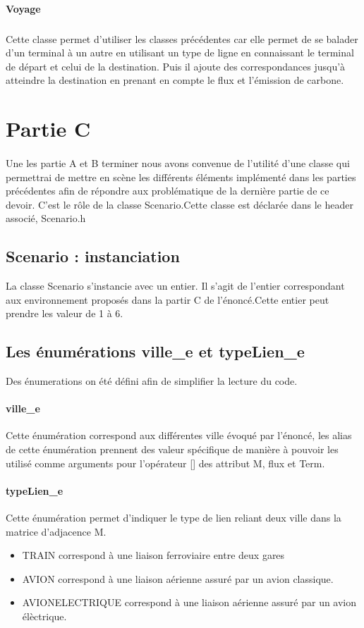\documentclass[a4paper]{article}
\begin{document}
\begin{justify}
		\paragraph{Voyage}
		\subparagraph{}Cette classe permet d’utiliser les classes précédentes car elle permet de se balader d’un terminal à un autre en utilisant un type de ligne en connaissant le terminal de départ et celui de la destination. Puis il ajoute des correspondances jusqu’à atteindre la destination en prenant en compte le flux et l’émission de carbone.
	\section{Partie C}
		\paragraph{}
		Une les partie A et B terminer nous avons convenue de l'utilité d'une classe qui permettrai de mettre en scène les différents éléments implémenté dans les parties précédentes afin de répondre aux problématique de la dernière partie de ce devoir. C'est le rôle de la classe Scenario.\newline Cette classe est déclarée dans le header associé, Scenario.h
		\subsection{Scenario : instanciation}
		La classe Scenario s'instancie avec un entier. Il s'agit de l'entier correspondant aux environnement proposés dans la partir C de l'énoncé.\newline Cette entier peut prendre les valeur de 1 à 6.
	\end{justify}
		
		\subsection{Les énumérations ville\_e et typeLien\_e}
		Des énumerations on été défini afin de simplifier la lecture du code.
		\paragraph{ville\_e}
		Cette énumération correspond aux différentes ville évoqué par l'énoncé, les alias de cette énumération prennent des valeur spécifique de manière à pouvoir les utilisé comme arguments pour l'opérateur [] des attribut M, flux et Term.
		\paragraph{typeLien\_e}
		Cette énumération permet d'indiquer le type de lien reliant deux ville dans la matrice d'adjacence M.\newline
		\begin{itemize}
		\item{TRAIN} correspond à une liaison ferroviaire entre deux gares
		\item{AVION} correspond à une liaison aérienne assuré par un avion classique.
		\item{AVIONELECTRIQUE} correspond à une liaison aérienne assuré par un avion élèctrique.
		\end{itemize}
		
\end{document}
